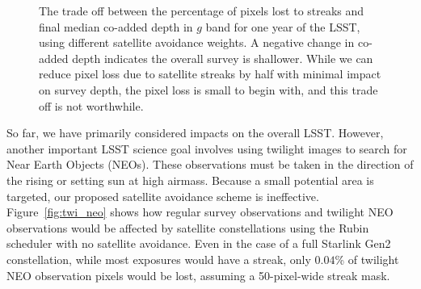 \documentclass[twocolumn]{aastex631}
\begin{document}
\begin{figure}[ht!]
\caption{The trade off between the percentage of pixels lost to streaks and final median co-added depth in $g$ band for one year of the LSST, using different satellite avoidance weights. A negative change in co-added depth indicates the overall survey is shallower. While we can reduce pixel loss due to satellite streaks by half with minimal impact on survey depth, the pixel loss is small to begin with, and this trade off is not worthwhile.
\label{fig-trade-off}}
\end{figure}

So far, we have primarily considered impacts on the overall LSST. However, another important LSST science goal involves using twilight images to search for Near Earth Objects (NEOs). These observations must be taken in the direction of the rising or setting sun at high airmass. Because a small potential area is targeted, our proposed satellite avoidance scheme is ineffective. Figure~\ref{fig:twi_neo} shows how regular survey observations and twilight NEO observations would be affected by satellite constellations using the Rubin scheduler with no satellite avoidance. Even in the case of a full Starlink Gen2 constellation, while most exposures would have a streak, only $0.04$\% of twilight NEO observation pixels would be lost, assuming a 50-pixel-wide streak mask.

\begin{figure*}
\centering
{}
\caption{Impacts of satellite streaks on simulated LSST observations without any satellite dodging. Compared to standard LSST observations (top), twilight NEO observations (bottom) cannot easily be shifted to avoid satellites. The left panels show the altitude and azimuth distribution of observations on the sky, and the right panels show how many streaks would result from the three simulated satellite constellations as a function of how high above the horizon the telescope is pointing (observation altitude). Even though most twilight NEO observations would contain a satellite streak, pixel loss is still low.
\label{fig:twi_neo}}
\end{figure*}
\end{document}
